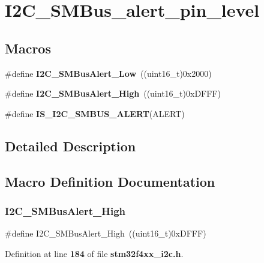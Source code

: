 \section{I2\+C\+\_\+\+S\+M\+Bus\+\_\+alert\+\_\+pin\+\_\+level}
\label{group__I2C__SMBus__alert__pin__level}
\subsection*{Macros}
\begin{DoxyCompactItemize}
\item 
\#define \textbf{ I2\+C\+\_\+\+S\+M\+Bus\+Alert\+\_\+\+Low}~((uint16\+\_\+t)0x2000)
\item 
\#define \textbf{ I2\+C\+\_\+\+S\+M\+Bus\+Alert\+\_\+\+High}~((uint16\+\_\+t)0x\+D\+F\+F\+F)
\item 
\#define \textbf{ I\+S\+\_\+\+I2\+C\+\_\+\+S\+M\+B\+U\+S\+\_\+\+A\+L\+E\+RT}(A\+L\+E\+RT)
\end{DoxyCompactItemize}


\subsection{Detailed Description}


\subsection{Macro Definition Documentation}
\mbox{\label{group__I2C__SMBus__alert__pin__level_gac3ab64f43ef90f0f83f9c88981aaa862}} 
\subsubsection{I2\+C\+\_\+\+S\+M\+Bus\+Alert\+\_\+\+High}
{\footnotesize\ttfamily \#define I2\+C\+\_\+\+S\+M\+Bus\+Alert\+\_\+\+High~((uint16\+\_\+t)0x\+D\+F\+F\+F)}



Definition at line \textbf{ 184} of file \textbf{ stm32f4xx\+\_\+i2c.\+h}.

